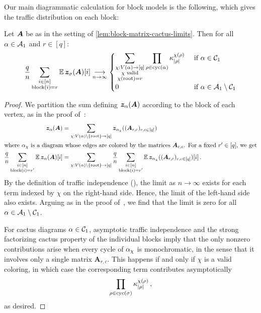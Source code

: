 Our main diagrammatic calculation for block models is the following, which gives the traffic distribution on each block:

\begin{lemma}\label{claim:insideBlock}
    Let ${\bm A}$ be as in the setting of \cref{lem:block-matrix-cactus-limits}.
    Then for all $\alpha \in {\cal A}_1$ and $r \in [q]$:
    \[
        \frac qn \sum_{\substack{i\in [n]\\\operatorname{block}(i)=r}} \operatorname*{\mathbb{E}} \bm z_\sigma(\bm A)[i] \underset{n\to\infty}{\longrightarrow} \begin{cases}\displaystyle
        \sum_{\substack{\chi:V(\alpha)\to [q]\\\chi \textnormal{ valid}\\\chi(\textnormal{root})=r}} \prod_{\rho \in \mathrm{cyc}(\alpha)} \kappa_{|\rho|}^{\chi(\rho)} & \text{ if }\alpha \in {\cal C}_1\\
        0 &\text{ if } \alpha \in {\cal A}_1 \setminus {\cal C}_1
        \end{cases}
    \]
\end{lemma}
\begin{proof}
    We partition the sum defining ${\bm z}_\alpha({\bm A})$ according to the block of each vertex, as in the proof of~:
    \begin{align*}
        {\bm z}_\alpha({\bm A}) &= \sum_{\chi : V(\alpha) \setminus \{\text{root}\} \to [q]} {\bm z}_{\alpha_\chi}(({\bm A}_{r,c})_{r,c \in [q]})\\
        \intertext{where $\alpha_\chi$ is a diagram whose edges are colored by the matrices ${\bm A}_{r,c}$. For a fixed $r' \in [q]$, we get}
        \frac qn \sum_{\substack{i \in [n]\\ \operatorname{block}(i) = r'}} \operatorname*{\mathbb{E}}{\bm z}_\alpha({\bm A})[i] &= \sum_{\chi : V(\alpha) \setminus \{\text{root}\} \to [q]} \frac qn \sum_{\substack{i \in [n]\\ \operatorname{block}(i) = r'}}\operatorname*{\mathbb{E}}{\bm z}_{\alpha_\chi}(({\bm A}_{r,c})_{r,c \in [q]})[i]\,.
    \end{align*}
    By the definition of traffic independence (), the limit as $n\to\infty$ exists for each term indexed by $\chi$ on the right-hand side.
    Hence, the limit of the left-hand side also exists.
    Arguing as in the proof of~, we find that the limit is zero for all $\alpha \in {\cal A}_1 \setminus {\cal C}_1$.
    
    For cactus diagrams $\alpha \in {\cal C}_1$, asymptotic traffic independence and the strong factorizing cactus property of the individual blocks imply that the only nonzero contributions arise when every cycle of $\alpha_\chi$ is monochromatic, in the sense that it involves only a single matrix $\bm A_{r,c}$. 
    This
    happens if and only if $\chi$ is a valid coloring, in which case the corresponding term contributes asymptotically
    \[\prod_{\rho\in \mathrm{cyc}(\sigma)} \kappa_{|\rho|}^{\chi(\rho)}\,,\] as desired.
\end{proof}


